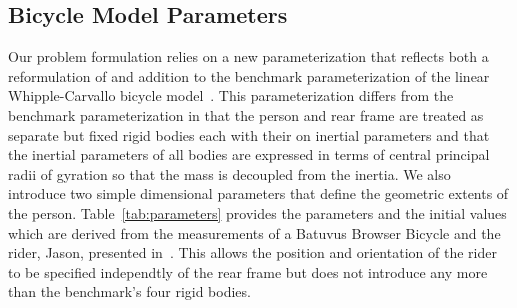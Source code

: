 \documentclass{bmd2019a}
\begin{document}
\subsection{Bicycle Model Parameters}
%
Our problem formulation relies on a new parameterization that reflects both a
reformulation of and addition to the benchmark parameterization of the linear
Whipple-Carvallo bicycle model~\cite{Meijaard2007}. This parameterization
differs from the benchmark parameterization in that the person and rear frame
are treated as separate but fixed rigid bodies each with their on inertial
parameters and that the inertial parameters of all bodies are expressed in
terms of central principal radii of gyration so that the mass is decoupled from
the inertia. We also introduce two simple dimensional parameters that define
the geometric extents of the person. Table~\ref{tab:parameters} provides the
parameters and the initial values which are derived from the measurements of a
Batuvus Browser Bicycle and the rider, Jason, presented in~\cite{Moore2012}.
This allows the position and orientation of the rider to be specified
independtly of the rear frame but does not introduce any more than the
benchmark's four rigid bodies.
%
\end{document}
